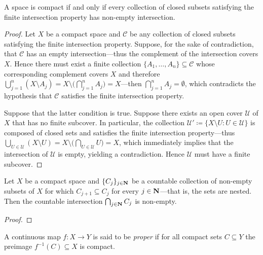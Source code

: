 \begin{proposition}
    \label{prop:compact-iff-FIP}
    A space is compact if and only if every collection of closed subsets satisfying
    the finite intersection property has non-empty intersection.
\end{proposition}

\begin{proof}
    Let \(X\) be a compact space and \(\mathcal{C}\) be any collection of closed
    subsets satisfying the finite intersection property. Suppose, for the sake of
    contradiction, that \(\mathcal{C}\) has an empty intersection---thus the
    complement of the intersection covers \(X\). Hence there must exist a finite
    collection \(\{A_1, \dots, A_n\} \subseteq \mathcal{C}\) whose corresponding
    complement covers \(X\) and therefore
    \(\bigcup_{j=1}^n (X \setminus A_j) = X \setminus \big( \bigcap_{j=1}^n A_j \big)
    = X\)---then \(\bigcap_{j=1}^n A_j = \emptyset\), which contradicts the
    hypothesis that \(\mathcal{C}\) satisfies the finite intersection property.

    Suppose that the latter condition is true. Suppose there exists an open cover
    \(\mathcal{U}\) of \(X\) that has no finite subcover. In particular, the
    collection \(\mathcal{U}' \coloneq \{X \setminus U : U \in \mathcal{U}\}\) is
    composed of closed sets and satisfies the finite intersection property---thus
    \(\bigcup_{U \in \mathcal{U}} (X \setminus U) = X \setminus \big( \bigcap_{U \in
        \mathcal{U}} U \big) = X\), which immediately implies that the intersection of
    \(\mathcal{U}\) is empty, yielding a contradiction. Hence \(\mathcal{U}\) must
    have a finite subcover.
\end{proof}

\begin{lemma}
    \label{lem:cpct-countable-intersection-nested-non-empty}
    Let \(X\) be a compact space and \(\{C_j\}_{j \in \mathbf{N}}\) be a countable
    collection of non-empty subsets of \(X\) for which \(C_{j+1} \subseteq C_j\) for
    every \(j \in \mathbf{N}\)---that is, the sets are nested. Then the countable
    intersection \(\bigcap_{j \in \mathbf{N}} C_j\) is non-empty.
\end{lemma}

\begin{proof}
\end{proof}

\begin{definition}
    \label{def:proper-Top}
    A continuous map \(f: X \to Y\) is said to be \emph{proper} if for all compact
    sets \(C \subseteq Y\) the preimage \(f^{-1}(C) \subseteq X\) is compact.
\end{definition}

